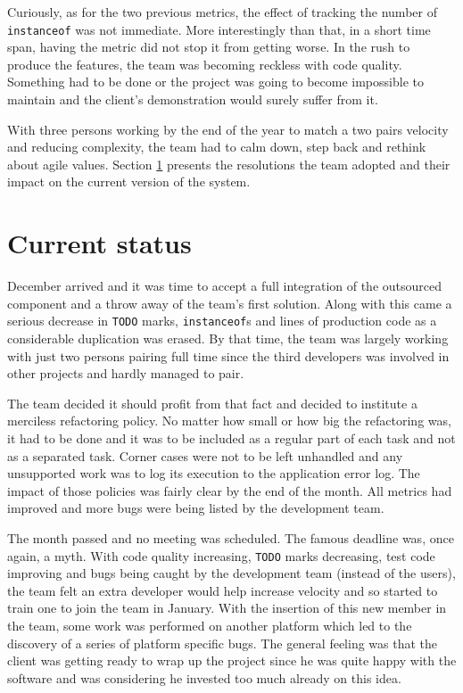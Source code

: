 \documentclass[lnbip]{svmultln}
\begin{document}
Curiously, as for the two previous metrics, the effect of tracking the
number of \texttt{instanceof} was not immediate. More interestingly
than that, in a short time span, having the metric did not stop it
from getting worse. In the rush to produce the features, the team was
becoming reckless with code quality.  Something had to be done or the
project was going to become impossible to maintain and the client's
demonstration would surely suffer from it.

With three persons working by the end of the year to match a two pairs
velocity and reducing complexity, the team had to calm down, step back
and rethink about agile values. Section \ref{sec:nowadays} presents
the resolutions the team adopted and their impact on the current
version of the system.

\section{Current status}
\label{sec:nowadays}

December arrived and it was time to accept a full integration of the
outsourced component and a throw away of the team's first
solution. Along with this came a serious decrease in \texttt{TODO}
marks, \texttt{instanceof}s and lines of production code as a
considerable duplication was erased. By that time, the team was
largely working with just two persons pairing full time since the
third developers was involved in other projects and hardly managed to
pair.

The team decided it should profit from that fact and decided to
institute a merciless refactoring policy. No matter how small or how
big the refactoring was, it had to be done and it was to be included
as a regular part of each task and not as a separated task. Corner
cases were not to be left unhandled and any unsupported work was to
log its execution to the application error log. The impact of those
policies was fairly clear by the end of the month. All metrics had
improved and more bugs were being listed by the development team.

The month passed and no meeting was scheduled. The famous deadline
was, once again, a myth. With code quality increasing, \texttt{TODO}
marks decreasing, test code improving and bugs being caught by the
development team (instead of the users), the team felt an extra
developer would help increase velocity and so started to train one to
join the team in January. With the insertion of this new member in the
team, some work was performed on another platform which led to the
discovery of a series of platform specific bugs. The general feeling
was that the client was getting ready to wrap up the project since he
was quite happy with the software and was considering he invested too
much already on this idea.
\end{document}
